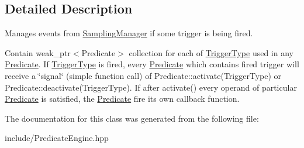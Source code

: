 \subsection{Detailed Description}
Manages events from \hyperlink{classSamplingManager}{Sampling\+Manager} if some trigger is being fired. 

Contain weak\+\_\+ptr$<$\+Predicate$>$ collection for each of \hyperlink{structTriggerType}{Trigger\+Type} used in any \hyperlink{classPredicate}{Predicate}. If \hyperlink{structTriggerType}{Trigger\+Type} is fired, every \hyperlink{classPredicate}{Predicate} which contains fired trigger will receive a \char`\"{}signal\char`\"{} (simple function call) of Predicate\+::activate(\+Trigger\+Type) or Predicate\+::deactivate(\+Trigger\+Type). If after activate() every operand of particular \hyperlink{classPredicate}{Predicate} is satisfied, the \hyperlink{classPredicate}{Predicate} fire its own callback function. 

The documentation for this class was generated from the following file\+:\begin{DoxyCompactItemize}
\item 
include/Predicate\+Engine.\+hpp\end{DoxyCompactItemize}
